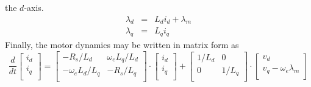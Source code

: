 \documentclass[11pt]{amsart}
\begin{document}
the $d$-axis.
%
\begin{eqnarray}
  \lambda_d &=& L_d i_d + \lambda_m \\
  \lambda_q &=& L_q i_q
\end{eqnarray}
%
Finally, the motor dynamics may be written in matrix form as
%
\begin{equation}
  \frac{d}{dt}
  \begin{bmatrix}
    i_d \\
    i_q \\
  \end{bmatrix}
  =
  \begin{bmatrix}
    -R_s / L_d          & \omega_e L_q / L_d \\
    -\omega_e L_d / L_q & -R_s / L_q \\
  \end{bmatrix}
  \cdot
  \begin{bmatrix}
    i_d \\
    i_q \\
  \end{bmatrix}
  +
  \begin{bmatrix}
    1/L_d & 0 \\
    0     & 1/L_q \\
  \end{bmatrix}
  \cdot
  \begin{bmatrix}
    v_d \\
    v_q - \omega_e \lambda_m \\
  \end{bmatrix}
\end{equation}
\end{document}
